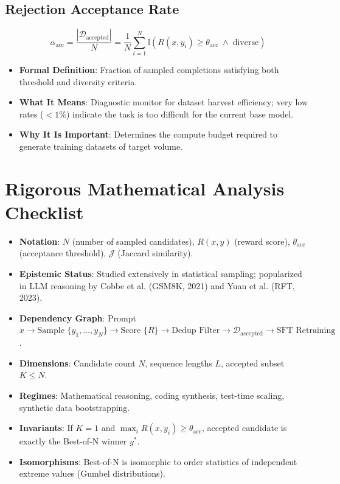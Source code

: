 \documentclass[11pt,a4paper]{article}
\theoremstyle{definition}
\begin{document}
\subsection{Rejection Acceptance Rate}
{\boldmath
\begin{equation}
\alpha_{\text{acc}} = \frac{|\mathcal{D}_{\text{accepted}}|}{N} = \frac{1}{N}\sum_{i=1}^N \mathbb{I}(R(x, y_i) \ge \theta_{\text{acc}} \;\land\; \text{diverse})
\end{equation}
}
\begin{itemize}
    \item \textbf{Formal Definition}: Fraction of sampled completions satisfying both threshold and diversity criteria.
    \item \textbf{What It Means}: Diagnostic monitor for dataset harvest efficiency; very low rates ($< 1\%$) indicate the task is too difficult for the current base model.
    \item \textbf{Why It Is Important}: Determines the compute budget required to generate training datasets of target volume.
\end{itemize}

\section{Rigorous Mathematical Analysis Checklist}

\begin{itemize}
    \item \textbf{Notation}: $N$ (number of sampled candidates), $R(x, y)$ (reward score), $\theta_{\text{acc}}$ (acceptance threshold), $\mathcal{J}$ (Jaccard similarity).
    \item \textbf{Epistemic Status}: Studied extensively in statistical sampling; popularized in LLM reasoning by Cobbe et al. (GSM8K, 2021) and Yuan et al. (RFT, 2023).
    \item \textbf{Dependency Graph}: Prompt $x \to \text{Sample } \{y_1, \dots, y_N\} \to \text{Score } \{R\} \to \text{Dedup Filter} \to \mathcal{D}_{\text{accepted}} \to \text{SFT Retraining}$.
    \item \textbf{Dimensions}: Candidate count $N$, sequence lengths $L$, accepted subset $K \le N$.
    \item \textbf{Regimes}: Mathematical reasoning, coding synthesis, test-time scaling, synthetic data bootstrapping.
    \item \textbf{Invariants}: If $K = 1$ and $\max_i R(x, y_i) \ge \theta_{\text{acc}}$, accepted candidate is exactly the Best-of-N winner $y^*$.
    \item \textbf{Isomorphisms}: Best-of-N is isomorphic to order statistics of independent extreme values (Gumbel distributions).
\end{itemize}
\end{document}
